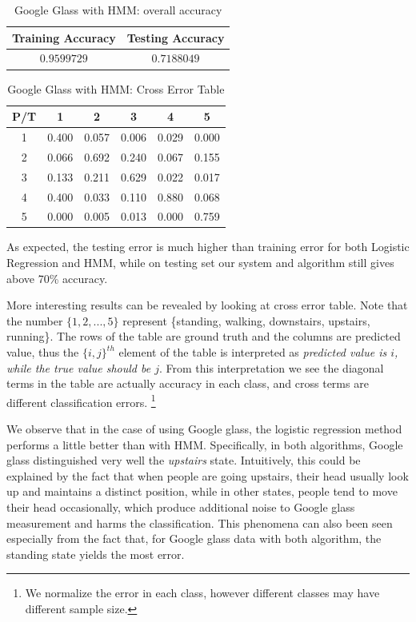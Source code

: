 \begin{itemize}
\begin{table}[!htb]
\begin{center}
\begin{tabular}{c|c}
      \hline
      Training Accuracy & Testing Accuracy\\
      \hline
      $0.9599729$ & $0.7188049$ \\
      \hline
\end{tabular}
\caption{Google Glass with HMM: overall accuracy}
\label{tab:glassHMM1}
\end{center}
\end{table}
\begin{table}[h]
\begin{center}
\begin{tabular}{c|c|c|c|c|c}
      \hline
      P/T& 1 & 2 &3 & 4 & 5 \\
      \hline
      1 &0.400&0.057&0.006&0.029&0.000\\
      2 &0.066&0.692&0.240&0.067&0.155\\
      3 &0.133&0.211&0.629&0.022&0.017\\
      4 &0.400&0.033&0.110&0.880&0.068\\
      5 & 0.000&0.005&0.013&0.000&0.759\\
      \hline
\end{tabular}
\caption{Google Glass with HMM: Cross Error Table}
\label{tab:glassHMM2}
\end{center}
\end{table}
\end{itemize}

As expected, the testing error is much higher than training error for both Logistic Regression and HMM, while on testing set our system and algorithm still gives above 70\% accuracy. 

More interesting results can be revealed by looking at cross error table. Note that the number $\{1,2,...,5\}$ represent \{standing, walking, downstairs, upstairs, running\}. The rows of the table are ground truth and the columns are predicted value, thus the $\{i,j\}^{th}$ element of the table is interpreted as \textit{predicted value is $i$, while the true value should be $j$}. From this interpretation we see the diagonal terms in the table are actually accuracy in each class, and cross terms are different classification errors. \footnote{We normalize the error in each class, however different classes may have different sample size.}

We observe that in the case of using Google glass, the logistic regression method performs a little better than with HMM. Specifically, in both algorithms, Google glass distinguished very well the \textit{upstairs} state. Intuitively, this could be explained by the fact that when people are going upstairs, their head usually look up and maintains a distinct position, while in other states, people tend to move their head occasionally, which produce additional noise to Google glass measurement and harms the classification. This phenomena can also been seen especially from the fact that, for Google glass data with both algorithm, the standing state yields the most error.


